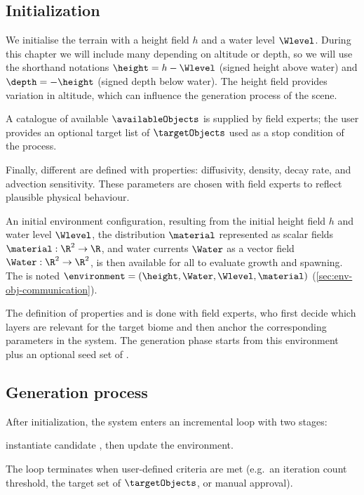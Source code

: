 \subsection{Initialization}

We initialise the terrain with a height field $h$ and a water level $\Wlevel$. During this chapter we will include many  depending on altitude or depth, so we will use the shorthand notations $\height = h-\Wlevel$ (signed height above water) and $\depth=-\height$ (signed depth below water). The height field provides variation in altitude, which can influence the generation process of the scene.

A catalogue of available  $\availableObjects$ is supplied by field experts; the user provides an optional target list of  $\targetObjects$ used as a stop condition of the process.

Finally, different  are defined with properties: diffusivity, density, decay rate, and advection sensitivity. These parameters are chosen with field experts to reflect plausible physical behaviour.

An initial environment configuration, resulting from the initial height field $h$ and water level $\Wlevel$, the  distribution $\material$ represented as scalar fields $\material: \R^2 \to \R$, and water currents $\Water$ as a vector field $\Water: \R^2 \to \R^2$, is then available for all  to evaluate growth and spawning. The  is noted $\environment = (\height, \Water, \Wlevel, \material)$ (\cref{sec:env-obj-communication}).

The definition of  properties and  is done with field experts, who first decide which  layers are relevant for the target biome and then anchor the corresponding parameters in the system.
The generation phase starts from this environment plus an optional seed set of .

\subsection{Generation process}

After initialization, the system enters an incremental loop with two stages:
\begin{Itemize}
    \Item{} instantiate candidate , then
    \Item{} update the environment.
\end{Itemize}
The loop terminates when user-defined criteria are met (e.g.\ an iteration count threshold, the target set of  $\targetObjects$, or manual approval).

